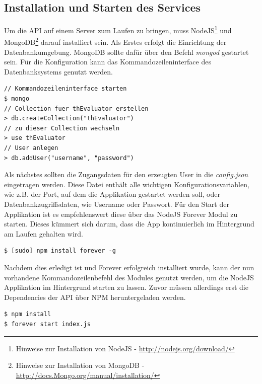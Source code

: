 \subsection{Installation und Starten des Services}

Um die API auf einem Server zum Laufen zu bringen, muss NodeJS\footnote{Hinweise zur Installation von NodeJS - \url{http://nodejs.org/download/}} und MongoDB\footnote{Hinweise zur Installation von MongoDB - \url{http://docs.Mongo.org/manual/installation/}} darauf installiert sein. Als Erstes erfolgt die Einrichtung der Datenbankumgebung. MongoDB sollte dafür über den Befehl \textit{mongod} gestartet sein. Für die Konfiguration kann das Kommandozeileninterface des Datenbanksystems genutzt werden.

\vspace{1cm}
\begin{lstlisting}[caption=Einrichten der Mongo Datenbank Datenbank,label=initMongo]
// Kommandozeileninterface starten
$ mongo
// Collection fuer thEvaluator erstellen
> db.createCollection("thEvaluator")
// zu dieser Collection wechseln
> use thEvaluator
// User anlegen
> db.addUser("username", "password")
\end{lstlisting}
\vspace{1cm}

Als nächstes sollten die Zugangsdaten für den erzeugten User in die \textit{config.json} eingetragen werden. Diese Datei enthält alle wichtigen Konfigurationsvariablen, wie z.B. der Port, auf dem die Applikation gestartet werden soll, oder Datenbankzugriffsdaten, wie Username oder Passwort. Für den Start der Applikation ist es empfehlenswert diese über das NodeJS Forever Modul zu starten. Dieses kümmert sich darum, dass die App kontinuierlich im Hintergrund am Laufen gehalten wird.

\vspace{1cm}
\begin{lstlisting}[caption=Installation von Forever auf dem Server,label=forever]
$ [sudo] npm install forever -g
\end{lstlisting}
\vspace{1cm}

Nachdem dies erledigt ist und Forever erfolgreich installiert wurde, kann der nun vorhandene Kommandozeilenbefehl des Modules genutzt werden, um die NodeJS Applikation im Hintergrund starten zu lassen. Zuvor müssen allerdings erst die Dependencies der API über NPM heruntergeladen werden.

\vspace{1cm}
\begin{lstlisting}[caption=Starten des API Services über den Forever-Befehl,label=forever]
$ npm install
$ forever start index.js
\end{lstlisting}

